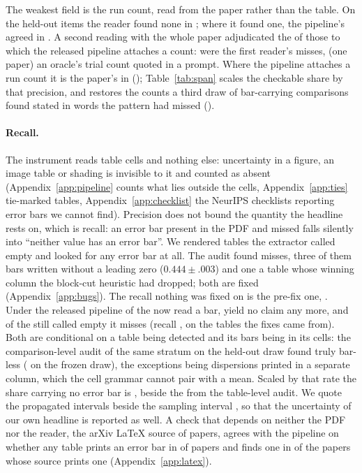 \documentclass{article}
\begin{document}
The weakest field is the run count, read from the paper rather than the table.
On the held-out items the reader found none in \nGoldHeldNoRunsFrac{}; where
it found one, the pipeline's agreed in \nGoldHeldRunsFoundFrac{}. A second
reading with the whole paper adjudicated the \nAdjPipelineHasCount{} of those
\nAdjReaderNoCount{} to which the released pipeline attaches a count:
\nAdjReaderMiss{} were the first reader's misses, \nAdjNotRunCount{} (one
paper) an oracle's trial count quoted in a prompt. Where the pipeline attaches
a run count it is the paper's in \nRunCountPrecisionFrac{}
(\nRunCountPrecision{}); Table~\ref{tab:span} scales the checkable share by
that precision, and restores the counts a third draw of \nGoldNoNN{} bar-carrying
comparisons found stated in words the pattern had missed (\nGoldNoNFoundFrac{}).

\paragraph{Recall.} The instrument reads table cells and nothing else:
uncertainty in a figure, an image table or shading is invisible to it and
counted as absent (Appendix~\ref{app:pipeline} counts what lies outside the
cells, Appendix~\ref{app:ties} tie-marked tables, Appendix~\ref{app:checklist}
the \nCheckYesNoTable{} NeurIPS checklists reporting error bars we cannot
find). Precision does not bound the quantity the headline rests on, which is
recall: an error bar present in the PDF and missed falls silently
into ``neither value has an error bar''. We rendered
\nRecallJudged{} tables the extractor called empty and looked for any error
bar at all. The audit found \nRecallFoundThen{} misses, three of
them bars written without a leading zero ($0.444 \pm .003$) and one a table
whose winning column the block-cut heuristic had dropped; both are fixed
(Appendix~\ref{app:bugs}). The recall nothing was fixed on is the pre-fix
one, \nRecallPreFix{}. Under the released pipeline \nRecallReadsBarNow{} of
the \nRecallJudged{} now read a bar, \nRecallDropped{} yield no claim any
more, and of the \nRecallStill{} still called empty it misses \nRecallMissed{}
(recall \nRecallCi{}, on the tables the fixes came from). Both are
conditional on a table
being detected and its bars being in its cells: the comparison-level audit of
the same stratum on the held-out draw found \nGoldNoBarAbsent{} truly
bar-less (\nGoldFrozenNoBarAbsentFrac{} on the frozen draw), the exceptions
being dispersions printed in a separate column, which the cell grammar cannot
pair with a mean. Scaled by that rate the share carrying no error bar is
\nHeadlineWithComparisonAudit{}, beside the \nHeadlineWithExtraction{} from
the table-level audit. We quote the propagated
intervals beside the sampling interval \nCiNeitherSide{}, so that the
uncertainty of our own headline is reported as well. A check that depends on neither the
PDF nor the reader, the arXiv LaTeX source of \nLatexWithTables{} papers,
agrees with the pipeline on whether any table prints an error bar in
\nLatexPaperAgree{} of papers and finds one in \nLatexPaperRecall{} of the
papers whose source prints one (Appendix~\ref{app:latex}).
\end{document}
